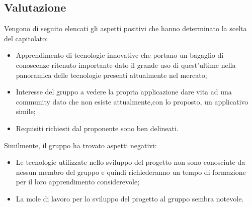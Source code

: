 \subsection{Valutazione}
        Vengono di seguito elencati gli aspetti positivi che hanno determinato la scelta del capitolato:
        \begin{itemize}
        \item Apprendimento di tecnologie innovative che portano un bagaglio di conoscenze ritenuto importante dato il grande uso di quest'ultime nella panoramica delle tecnologie presenti attualmente nel mercato;
        \item Interesse del gruppo a vedere la propria applicazione dare vita ad una community dato che non esiste attualmente,con 		lo   proposto, un applicativo simile;
        \item Requisiti richiesti dal proponente sono ben delineati.
        \end{itemize}
		Similmente, il gruppo ha trovato aspetti negativi:
        \begin{itemize}
        \item Le tecnologie utilizzate nello sviluppo del progetto non sono conosciute da nessun membro del gruppo \GroupName{} e
        quindi richiederanno un tempo di formazione per il loro apprendimento considerevole;
        \item La mole di lavoro per lo sviluppo del progetto al gruppo sembra notevole.
        \end{itemize}
        
